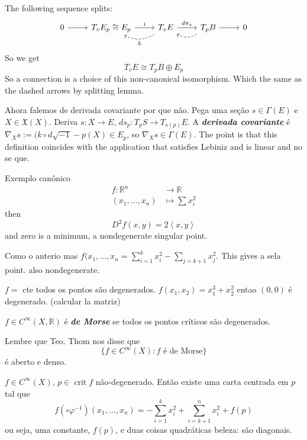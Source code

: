 \begin{exercise}
The following sequence splits:
\[\begin{tikzcd}0\arrow[r]&T_vE_p \cong E_p\arrow[r,"i"]&\arrow[l,dashed,bend left,"k"]T_vE\arrow[r,"d\pi_v"]&T_pB\arrow[l,dashed, bend left]\arrow[r]&0\end{tikzcd}\]
So we get
\[T_vE \cong T_pB \oplus  E_p\]
So a connection is a choice of this non-canonical isomorphism. Which the same as the dashed arrows by splitting lemma.

Ahora falemos de derivada covariante por que não. Pega uma seção \(s \in \Gamma(E)\) e \( X \in \mathfrak{X}(X)\). Deriva \(s: X \to E\), \(ds_p:T_pS \to T_{s(p)}E\). A \textit{\textbf{derivada covariante }} é \(\nabla_X s:=(k \circ d\sqrt{-1}-p(X)\in E_p\), so \(\nabla_Xs \in \Gamma(E)\). The point is that this definition coincides with the application that satisfies Lebiniz and is linear and no se que.
\end{exercise}

\begin{thing6}{Exemplo canônico}\leavevmode
\begin{align*}
	f: \mathbb{R}^n &\longrightarrow \mathbb{R} \\
	(x_1,\ldots,x_n) &\longmapsto \sum x_i^2
\end{align*}
then
 \[D^2f(x,y)=2 \left<x,y\right>\]
 and zero is a minimum, a nondegenerate singular point.
\end{thing6}

\begin{example}\leavevmode
Como o anterio mas \(f(x_1,\ldots,x_n=\sum_{i=1}^k x_i^2 -\sum_{j=k+1}x_j^2\). This gives a sela point. also nondegenerate.
\end{example}

\begin{example}\leavevmode
\(f=\) cte todos os pontos são degenerados. \(f(x_1,x_2)=x_1^3+x_2^2\) entao \((0,0)\) é degenerado. (calcular la matriz)
\end{example}

\begin{defn}\leavevmode
\(f \in C^\infty (X,\mathbb{R})\) é \textit{\textbf{de Morse}} se todos os pontos críticos são degenerados.
\end{defn}

\begin{prop}\leavevmode
Lembre que Teo. Thom nos disse que
\[\{ f \in C^\infty(X): f\text{ é de Morse} \}\]
é aberto e denso.
\end{prop}

\begin{lemma}[de Morse]\leavevmode
\(f \in C^\infty(X)\), \(p \in \operatorname{crit}f\) não-degenerado. Então existe uma carta centrada em \(p\) tal que
\[f(\circ \varphi^{-1})(x_1,\ldots,x_n)=-\sum_{i=1}^k x_i^2+ \sum_{i=k+1}^nx_i^2+f(p)\]
ou seja, uma constante, \(f(p)\), e duas coisas quadráticas beleza: são diagonais.
\end{lemma}

